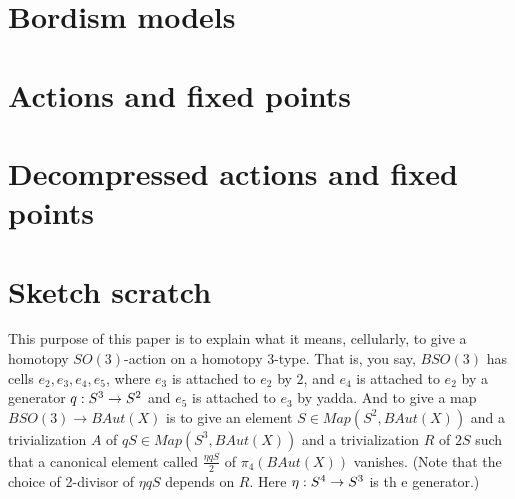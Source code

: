 \documentclass{amsart}
\begin{document}
\section{Bordism models}




\section{Actions and fixed points}



\section{Decompressed actions and fixed points}















\section*{Sketch scratch}

This purpose of this paper is to explain what it means, cellularly, to give a homotopy $SO(3)$-action on a homotopy 3-type.  That is, you say, $BSO(3)$ has cells $e_2, e_3, e_4, e_5$, where $e_3$ is attached to $e_2$ by $2$, and $e_4$ is attached to $e_2$ by a generator $q: S^3 \rightarrow S^2$ and $e_5$ is attached to $e_3$ by yadda.  And to give a map $BSO(3) \rightarrow BAut(X)$ is to give an element $S \in Map(S^2,BAut(X))$ and a trivialization $A$ of $q S \in Map(S^3,BAut(X))$ and a trivialization $R$ of $2S$ such that a canonical element called $\frac{\eta q S}{2}$ of $\pi_4(BAut(X))$ vanishes.  (Note that the choice of 2-divisor of $\eta q S$ depends on $R$.  Here $\eta: S^4 \rightarrow S^3$ is th 	e generator.)
\end{document}

